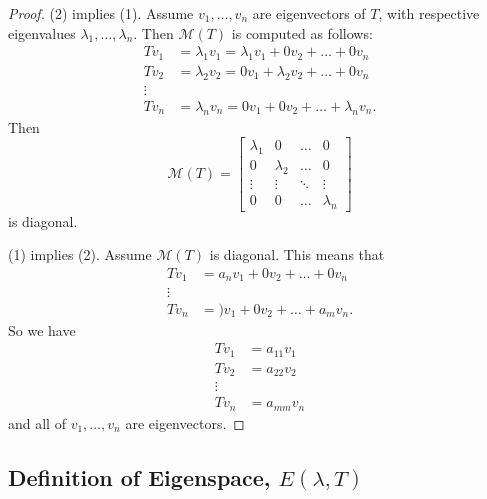 \documentclass[11pt]{article}
\begin{document}
    \begin{proof}
        (2) implies (1). Assume \(v_1, \dots, v_n\) are eigenvectors of $T$, with respective eigenvalues \(\lambda_1, \dots, \lambda_n\). Then \(\mathcal{M}(T)\) is computed as follows:
        \begin{align*}
            Tv_1 &= \lambda_1 v_1 = \lambda_1 v_1 + 0 v_2 + \dots + 0 v_n \\
            Tv_2 &= \lambda_2 v_2 = 0 v_1 + \lambda_2 v_2 + \dots + 0 v_n \\
            \vdots & \\
            Tv_n &= \lambda_n v_n = 0v_1 + 0 v_2 + \dots + \lambda_n v_n.
        \end{align*}
        Then 
        \begin{equation*}
            \mathcal{M}(T) = \begin{bmatrix}
                                \lambda_1 & 0 & \dots & 0 \\
                                0 & \lambda_2 & \dots & 0 \\
                                \vdots & \vdots & \ddots & \vdots \\
                                0 & 0 & \dots & \lambda_n
                             \end{bmatrix}
        \end{equation*}
        is diagonal.

        \vspace{1em}

        (1) implies (2). Assume \(\mathcal{M}(T)\) is diagonal. This means that 
        \begin{align*}
            Tv_1 &= a_n v_1 + 0 v_2 + \dots + 0 v_n \\
            \vdots & \\
            Tv_n &= )v_1 + 0v_2 + \dots + a_m v_n.
        \end{align*}
        So we have 
        \begin{align*}
            Tv_1 &= a_{11} v_1 \\
            Tv_2 &= a_{22} v_2 \\
            \vdots & \\
            Tv_n &= a_{mm} v_n
        \end{align*}
        and all of \(v_1, \dots, v_n\) are eigenvectors.
    \end{proof}

    \subsection{Definition of Eigenspace, \(E(\lambda, T)\)}
\end{document}
